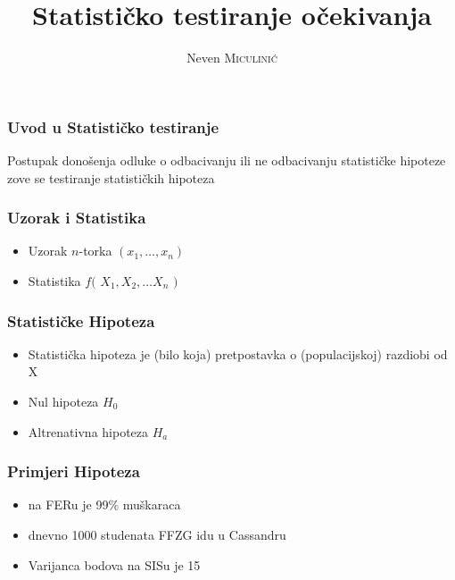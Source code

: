 \documentclass{beamer}
\title{Statističko testiranje očekivanja}
\author{Neven \textsc{Miculinić}}
\institute[FER] %
{
Fakultet Elektrotehnike i Računarstva \\ %
\medskip
\textit{neven.miculinic@fer.hr} %
}
\date{}
\begin{document}
\frame{\titlepage}

\begin{frame}
\frametitle{Uvod u Statističko testiranje}
Postupak donošenja odluke o odbacivanju ili ne odbacivanju
statističke hipoteze zove se testiranje statističkih
hipoteza
\end{frame}

\begin{frame}
\frametitle{Uzorak i Statistika}
\begin{itemize}[<+->]
\item Uzorak $n$-torka $(x_1, \ldots, x_n)$
\item Statistika $f($ $X_1 , X_2 , \ldots X_n$ $)$
\end{itemize}
\end{frame}

\begin{frame}
\frametitle{Statističke Hipoteza}
\begin{itemize}[<+->]
\item Statistička hipoteza je (bilo koja) pretpostavka o
(populacijskoj) razdiobi od X 
\item Nul hipoteza $H_0$
\item Altrenativna hipoteza $H_a$
\end{itemize}
\end{frame}

\begin{frame}
\frametitle{Primjeri Hipoteza}
\begin{itemize}
\item na FERu je 99\% muškaraca \pause
\item dnevno 1000 studenata FFZG idu u Cassandru \pause
\item Varijanca bodova na SISu je 15 \pause
\end{itemize}
\end{frame}
\end{document}
